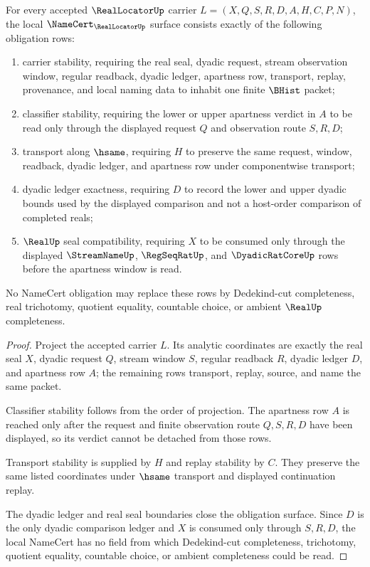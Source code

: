 \begin{theorem}
\label{thm:real-locator-namecert-obligations}
For every accepted $\RealLocatorUp$ carrier $L=(X,Q,S,R,D,A,H,C,P,N)$, the local $\NameCert_{\RealLocatorUp}$ surface consists exactly of the following obligation rows:
\begin{enumerate}
\item carrier stability, requiring the real seal, dyadic request, stream observation window, regular readback, dyadic ledger, apartness row, transport, replay, provenance, and local naming data to inhabit one finite $\BHist$ packet;
\item classifier stability, requiring the lower or upper apartness verdict in $A$ to be read only through the displayed request $Q$ and observation route $S,R,D$;
\item transport along $\hsame$, requiring $H$ to preserve the same request, window, readback, dyadic ledger, and apartness row under componentwise transport;
\item dyadic ledger exactness, requiring $D$ to record the lower and upper dyadic bounds used by the displayed comparison and not a host-order comparison of completed reals;
\item $\RealUp$ seal compatibility, requiring $X$ to be consumed only through the displayed $\StreamNameUp$, $\RegSeqRatUp$, and $\DyadicRatCoreUp$ rows before the apartness window is read.
\end{enumerate}
No NameCert obligation may replace these rows by Dedekind-cut completeness, real trichotomy, quotient equality, countable choice, or ambient $\RealUp$ completeness.
\end{theorem}
\begin{proof}
Project the accepted carrier $L$. Its analytic coordinates are exactly the real seal $X$, dyadic request $Q$, stream window $S$, regular readback $R$, dyadic ledger $D$, and apartness row $A$; the remaining rows transport, replay, source, and name the same packet.

Classifier stability follows from the order of projection. The apartness row $A$ is reached only after the request and finite observation route $Q,S,R,D$ have been displayed, so its verdict cannot be detached from those rows.

Transport stability is supplied by $H$ and replay stability by $C$. They preserve the same listed coordinates under $\hsame$ transport and displayed continuation replay.

The dyadic ledger and real seal boundaries close the obligation surface. Since $D$ is the only dyadic comparison ledger and $X$ is consumed only through $S,R,D$, the local NameCert has no field from which Dedekind-cut completeness, trichotomy, quotient equality, countable choice, or ambient completeness could be read.
\end{proof}

